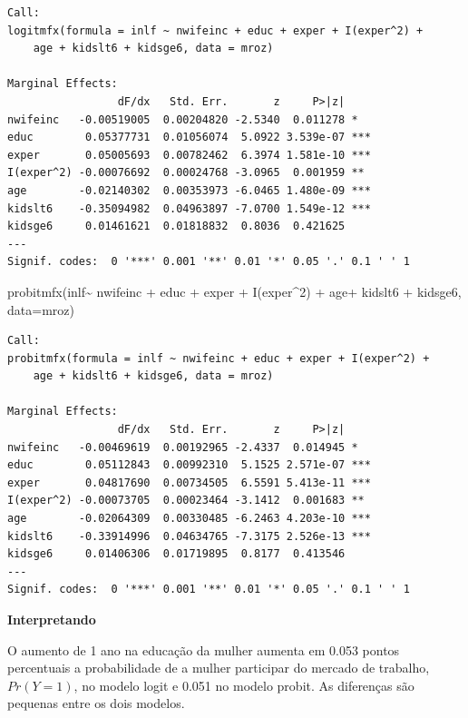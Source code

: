 \documentclass[
  letterpaper,
  DIV=11,
  numbers=noendperiod]{scrreprt}
\newenvironment{Shaded}{\begin{snugshade}}{\end{snugshade}}
\newcommand{\AttributeTok}[1]{\textcolor[rgb]{0.40,0.45,0.13}{#1}}
\newcommand{\DecValTok}[1]{\textcolor[rgb]{0.68,0.00,0.00}{#1}}
\newcommand{\FunctionTok}[1]{\textcolor[rgb]{0.28,0.35,0.67}{#1}}
\newcommand{\NormalTok}[1]{\textcolor[rgb]{0.00,0.23,0.31}{#1}}
\newcommand{\SpecialCharTok}[1]{\textcolor[rgb]{0.37,0.37,0.37}{#1}}
\begin{document}
\begin{verbatim}
Call:
logitmfx(formula = inlf ~ nwifeinc + educ + exper + I(exper^2) + 
    age + kidslt6 + kidsge6, data = mroz)

Marginal Effects:
                 dF/dx   Std. Err.       z     P>|z|    
nwifeinc   -0.00519005  0.00204820 -2.5340  0.011278 *  
educ        0.05377731  0.01056074  5.0922 3.539e-07 ***
exper       0.05005693  0.00782462  6.3974 1.581e-10 ***
I(exper^2) -0.00076692  0.00024768 -3.0965  0.001959 ** 
age        -0.02140302  0.00353973 -6.0465 1.480e-09 ***
kidslt6    -0.35094982  0.04963897 -7.0700 1.549e-12 ***
kidsge6     0.01461621  0.01818832  0.8036  0.421625    
---
Signif. codes:  0 '***' 0.001 '**' 0.01 '*' 0.05 '.' 0.1 ' ' 1
\end{verbatim}

\begin{Shaded}
\begin{Highlighting}[]
\FunctionTok{probitmfx}\NormalTok{(inlf}\SpecialCharTok{\textasciitilde{}}\NormalTok{ nwifeinc }\SpecialCharTok{+}\NormalTok{ educ }\SpecialCharTok{+}\NormalTok{ exper }\SpecialCharTok{+} \FunctionTok{I}\NormalTok{(exper}\SpecialCharTok{\^{}}\DecValTok{2}\NormalTok{) }\SpecialCharTok{+} 
\NormalTok{                  age}\SpecialCharTok{+}\NormalTok{ kidslt6 }\SpecialCharTok{+}\NormalTok{ kidsge6, }\AttributeTok{data=}\NormalTok{mroz)}
\end{Highlighting}
\end{Shaded}

\begin{verbatim}
Call:
probitmfx(formula = inlf ~ nwifeinc + educ + exper + I(exper^2) + 
    age + kidslt6 + kidsge6, data = mroz)

Marginal Effects:
                 dF/dx   Std. Err.       z     P>|z|    
nwifeinc   -0.00469619  0.00192965 -2.4337  0.014945 *  
educ        0.05112843  0.00992310  5.1525 2.571e-07 ***
exper       0.04817690  0.00734505  6.5591 5.413e-11 ***
I(exper^2) -0.00073705  0.00023464 -3.1412  0.001683 ** 
age        -0.02064309  0.00330485 -6.2463 4.203e-10 ***
kidslt6    -0.33914996  0.04634765 -7.3175 2.526e-13 ***
kidsge6     0.01406306  0.01719895  0.8177  0.413546    
---
Signif. codes:  0 '***' 0.001 '**' 0.01 '*' 0.05 '.' 0.1 ' ' 1
\end{verbatim}

\textbf{Interpretando}

O aumento de 1 ano na educação da mulher aumenta em 0.053 pontos
percentuais a probabilidade de a mulher participar do mercado de
trabalho, \(Pr(Y=1)\), no modelo logit e 0.051 no modelo probit. As
diferenças são pequenas entre os dois modelos.
\end{document}
